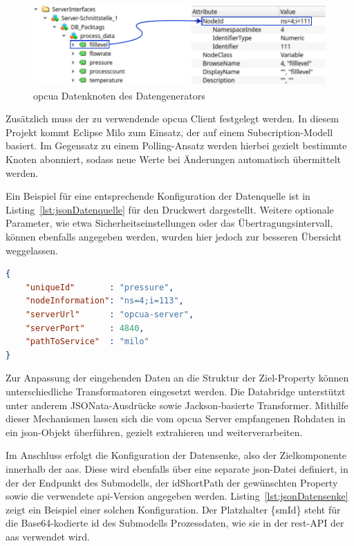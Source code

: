 \newpage
\begin{figure}[htbp]
    \centering
    \includegraphics{Bilder/OPCUA/OPCUADaten.pdf}
    \caption[\acs{opcua} Datenknoten des Datengenerators]{\acs{opcua} Datenknoten des Datengenerators}
    \label{fig:OPCUADatenStruktur}
\end{figure}

Zusätzlich muss der zu verwendende \acs{opcua} Client festgelegt werden.
In diesem Projekt kommt Eclipse Milo zum Einsatz, der auf einem Subscription-Modell basiert.
Im Gegensatz zu einem Polling-Ansatz werden hierbei gezielt bestimmte Knoten abonniert, sodass neue Werte bei Änderungen automatisch übermittelt werden.

Ein Beispiel für eine entsprechende Konfiguration der Datenquelle ist in Listing~\ref{lst:jsonDatenquelle} für den Druckwert dargestellt.
Weitere optionale Parameter, wie etwa Sicherheitseinstellungen oder das Übertragungsintervall, können ebenfalls angegeben werden, wurden hier jedoch zur besseren Übersicht weggelassen.

\begin{lstlisting}[language=json, caption={\acs{json}-Konfiguration einer Datenquelle}, label={lst:jsonDatenquelle}]
{
    "uniqueId"       : "pressure",
    "nodeInformation": "ns=4;i=113",
    "serverUrl"      : "opcua-server",
    "serverPort"     : 4840,
    "pathToService"  : "milo"
}
\end{lstlisting}

Zur Anpassung der eingehenden Daten an die Struktur der Ziel-Property können unterschiedliche Transformatoren eingesetzt werden.
Die Databridge unterstützt unter anderem JSONata-Ausdrücke sowie Jackson-basierte Transformer.
Mithilfe dieser Mechanismen lassen sich die vom \acs{opcua} Server empfangenen Rohdaten in ein \acs{json}-Objekt überführen, gezielt extrahieren und weiterverarbeiten.

Im Anschluss erfolgt die Konfiguration der Datensenke, also der Zielkomponente innerhalb der \acs{aas}.
Diese wird ebenfalls über eine separate \acs{json}-Datei definiert, in der der Endpunkt des Submodells, der idShortPath der gewünschten Property sowie die verwendete \acs{api}-Version angegeben werden.
Listing~\ref{lst:jsonDatensenke} zeigt ein Beispiel einer solchen Konfiguration.
Der Platzhalter \{smId\} steht für die Base64-kodierte \acs{id} des Submodells Prozessdaten, wie sie in der \acs{rest}-API der \acs{aas} verwendet wird.

